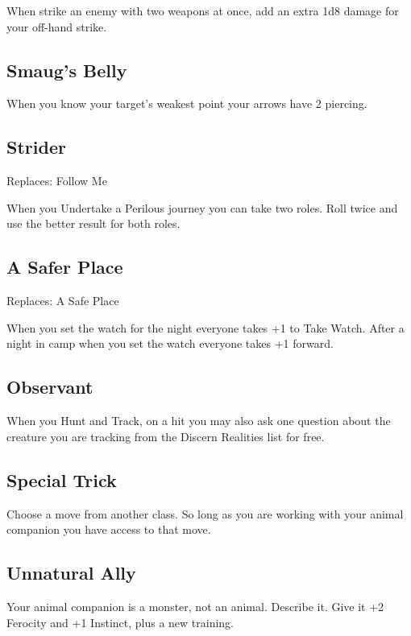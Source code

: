 When strike an enemy with two weapons at once, add an extra 1d8 damage for your off-hand strike.

 
\subsection{Smaug's Belly}    
 

When you know your target's weakest point your arrows have 2 piercing.

 
\subsection{Strider}   
 

Replaces: Follow Me

 

When you Undertake a Perilous journey you can take two roles. Roll twice and use the better result for both roles.

 
\subsection{A Safer Place}    
 

Replaces: A Safe Place

 

When you set the watch for the night everyone takes +1 to Take Watch. After a night in camp when you set the watch everyone takes +1 forward.

 
\subsection{Observant}   
 

When you Hunt and Track, on a hit you may also ask one question about the creature you are tracking from the Discern Realities list for free.

 
\subsection{Special Trick}    
 

Choose a move from another class. So long as you are working with your animal companion you have access to that move.

 
\subsection{Unnatural Ally}    
 

Your animal companion is a monster, not an animal. Describe it. Give it +2 Ferocity and +1 Instinct, plus a new training.









 
